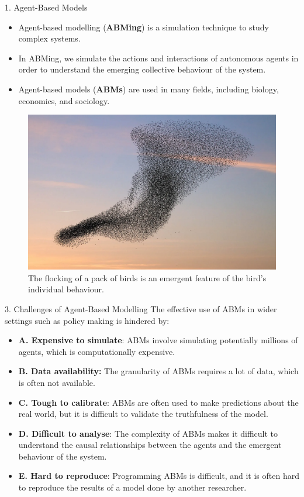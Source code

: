 \documentclass[final,hyperref={pdfpagelabels=false}]{beamer}
\newcommand{\shrink}{-15pt}
\begin{document}
\begin{frame}[t]
\begin{columns}[t]
\begin{column}{.48\textwidth}
    \vspace{\shrink}          
    \begin{block}{1. Agent-Based Models}
      \begin{itemize}
          \item Agent-based modelling (\textbf{ABMing}) is a simulation technique to study complex systems.
          \item In ABMing, we simulate the actions and interactions of autonomous agents in order to understand the emerging collective behaviour of the system.
          \item Agent-based models (\textbf{ABMs}) are used in many fields, including biology, economics, and sociology.
      \end{itemize}
      \begin{figure}
        \centering
        \includegraphics[width=0.8\columnwidth]{figures/birds}
        \caption{\footnotesize The flocking of a pack of birds is an emergent feature of the bird's individual behaviour.}
      \end{figure}
    \end{block}
    \begin{block}{3. Challenges of Agent-Based Modelling}
      The effective use of ABMs in wider settings such as policy making is hindered by:
      \begin{itemize}
        \item\justifying \textbf{A. Expensive to simulate}: ABMs involve simulating potentially millions of agents, which is computationally expensive.
        \item\justifying \textbf{B. Data availability:} The granularity of ABMs requires a lot of data, which is often not available.
        \item\justifying\textbf{C. Tough to calibrate}: ABMs are often used to make predictions about the real world, but it is difficult to validate the truthfulness of the model.
        \item\justifying \textbf{D. Difficult to analyse}: The complexity of ABMs makes it difficult to understand the causal 
          relationships between the agents and the emergent behaviour of the system.
        \item\justifying \textbf{E. Hard to reproduce}: Programming ABMs is difficult, and it is often hard to 
          reproduce the results of a model done by another researcher.
      \end{itemize}
    \end{block}


\end{column}
\end{columns}
\end{frame}
\end{document}

